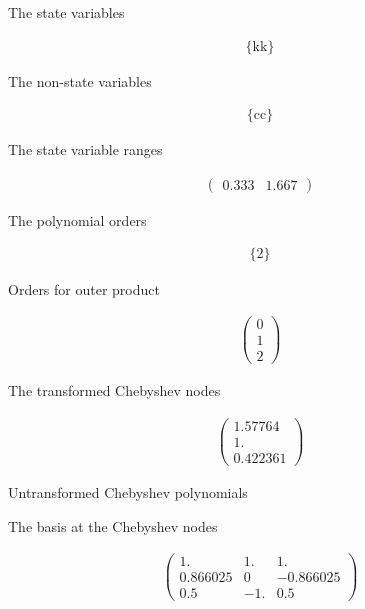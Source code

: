 %
\newcommand{\aVar}[4]{\item[$#1(#4)$] \ 
  \begin{itemize}
  \item    \texttt{[image: \#2]}
  \item    \texttt{[image: \#3]}
  \end{itemize}
}

The state variables

\begin{gather*}
  \{\text{kk}\}
\end{gather*}


The non-state variables

\begin{gather*}
  \{\text{cc}\}
\end{gather*}




The state variable ranges

\begin{gather*}
\left(
\begin{array}{cc}
 0.333 & 1.667
\end{array}
\right)  
\end{gather*}


The polynomial orders

\begin{gather*}
  \{2\}
\end{gather*}

Orders for outer product

\begin{gather*}
\left(
\begin{array}{c}
 0 \\
 1 \\
 2
\end{array}
\right)
\end{gather*}


The transformed Chebyshev nodes 

\begin{gather*}
\left(
\begin{array}{c}
 1.57764 \\
 1. \\
 0.422361
\end{array}
\right)  
\end{gather*}


Untransformed Chebyshev polynomials




The basis at the Chebyshev nodes

\begin{gather*}
  \left(
\begin{array}{ccc}
 1. & 1. & 1. \\
 0.866025 & 0 & -0.866025 \\
 0.5 & -1. & 0.5
\end{array}
\right)
\end{gather*}

